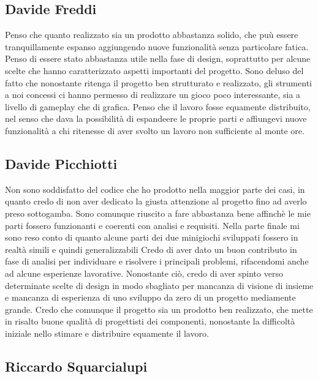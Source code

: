 \documentclass[a4paper,12pt]{report}
\begin{document}
    \subsection{Davide Freddi}
    Penso che quanto realizzato sia un prodotto abbastanza solido, che puù essere tranquillamente espanso aggiungendo nuove funzionalità senza particolare fatica.
    Penso di essere stato abbastanza utile nella fase di design, soprattutto per alcune scelte che hanno caratterizzato aspetti importanti del progetto.
    Sono deluso del fatto che nonostante ritenga il progetto ben strutturato e realizzato, gli strumenti a noi concessi ci hanno permesso di realizzare un gioco poco interessante, sia a livello di gameplay che di grafica.
    Penso che il lavoro fosse equamente distribuito, nel senso che dava la possibilità di espandeere le proprie parti e affiungevi nuove funzionalità a chi ritenesse di aver svolto un lavoro non sufficiente al monte ore.
    \subsection{Davide Picchiotti}
    Non sono soddisfatto del codice che ho prodotto nella maggior parte dei casi, in quanto credo di non aver dedicato la giusta attenzione
    al progetto fino ad averlo preso sottogamba.
    Sono comunque riuscito a fare abbastanza bene affinchè le mie parti fossero funzionanti e coerenti con analisi e requisiti.\newline
    Nella parte finale mi sono reso conto di quanto alcune parti dei due minigiochi sviluppati fossero in realtà simili e quindi generalizzabili\newline
    Credo di aver dato un buon contributo in fase di analisi per individuare e risolvere i principali problemi, rifacendomi anche ad alcune esperienze lavorative.
    Nonostante ciò, credo di aver spinto verso determinate scelte di design in modo sbagliato per mancanza di visione di insieme e mancanza
    di esperienza di uno sviluppo da zero di un progetto mediamente grande.\newline
    Credo che comunque il progetto sia un prodotto ben realizzato, che mette in risalto buone qualità di progettisti dei componenti,
    nonostante la difficoltà iniziale nello stimare e distribuire equamente il lavoro.

    \subsection{Riccardo Squarcialupi}
\end{document}
